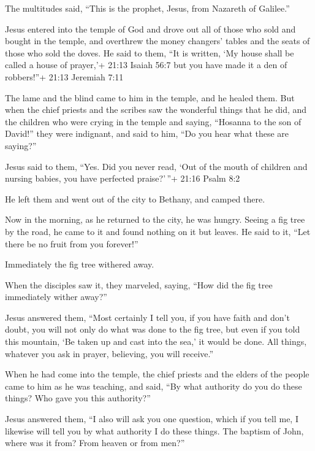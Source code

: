  The multitudes said, ``This is the prophet, Jesus, from
Nazareth of Galilee.''

 Jesus entered into the temple of God and drove out all of
those who sold and bought in the temple, and overthrew the money
changers' tables and the seats of those who sold the doves.
 He said to them, ``It is written, `My house shall be
called a house of prayer,'+ 21:13 Isaiah 56:7 but you have made it a den
of robbers!''+ 21:13 Jeremiah 7:11

 The lame and the blind came to him in the temple, and he
healed them.  But when the chief priests and the scribes
saw the wonderful things that he did, and the children who were crying
in the temple and saying, ``Hosanna to the son of David!'' they were
indignant,  and said to him, ``Do you hear what these are
saying?''

Jesus said to them, ``Yes. Did you never read, `Out of the mouth of
children and nursing babies, you have perfected praise?'\,''+ 21:16
Psalm 8:2

 He left them and went out of the city to Bethany, and
camped there.

 Now in the morning, as he returned to the city, he was
hungry.  Seeing a fig tree by the road, he came to it and
found nothing on it but leaves. He said to it, ``Let there be no fruit
from you forever!''

Immediately the fig tree withered away.

 When the disciples saw it, they marveled, saying, ``How
did the fig tree immediately wither away?''

 Jesus answered them, ``Most certainly I tell you, if you
have faith and don't doubt, you will not only do what was done to the
fig tree, but even if you told this mountain, `Be taken up and cast into
the sea,' it would be done.  All things, whatever you ask
in prayer, believing, you will receive.''

 When he had come into the temple, the chief priests and
the elders of the people came to him as he was teaching, and said, ``By
what authority do you do these things? Who gave you this authority?''

 Jesus answered them, ``I also will ask you one question,
which if you tell me, I likewise will tell you by what authority I do
these things.  The baptism of John, where was it from? From
heaven or from men?''

